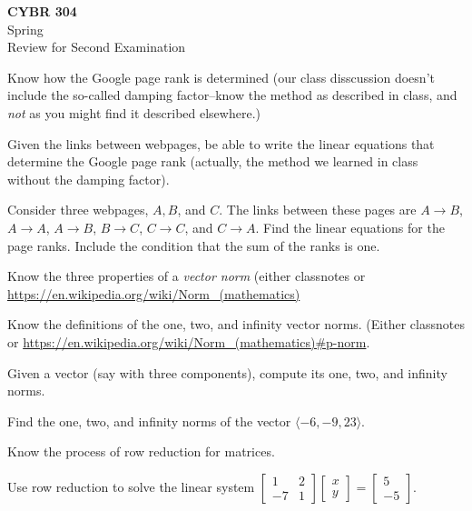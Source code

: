 \documentclass[12pt,fleqn]{exam}
\begin{document}
\begin{flushleft}

{\bf CYBR 304} \\
   Spring \the\year\\
  Review for Second Examination
\end{flushleft}


\begin{questions}

\item Know how the Google page rank is determined (our class disscussion doesn't include the so-called damping factor--know the method as described in class, and \emph{not} as you might find it
described elsewhere.)

\item Given the links between webpages, be able to write the linear equations that determine the Google page rank (actually, the method we learned in class without the damping factor).

\item Consider three webpages, $A,B$, and $C$. The links between these pages are $A \to B$, $A \to A$, $A \to B$, $B \to C$, $C \to C$, and $C \to A$. Find the  linear equations for
the page ranks. Include the condition that the sum of the ranks is one.

\item Know the three properties of a \emph{vector norm} (either classnotes or  \url{https://en.wikipedia.org/wiki/Norm_(mathematics)}


\item Know the definitions of the one, two, and infinity vector norms. (Either classnotes or \url{https://en.wikipedia.org/wiki/Norm_(mathematics)#p-norm}.

\item Given a vector (say with three components), compute its one, two, and infinity norms.

\item Find the one, two, and infinity norms of the vector $\langle -6, -9, 23 \rangle$.

\item Know the process of row reduction for matrices.

\question   Use row reduction to solve the linear system  \( \begin{bmatrix}1 & 2\\
-7 & 1 \end{bmatrix} \begin{bmatrix} x  \\  y \end{bmatrix}= \begin{bmatrix} 5  \\ -5 \end{bmatrix} \).
\begin{solution}%


\end{solution}
\end{questions}
\end{document}
